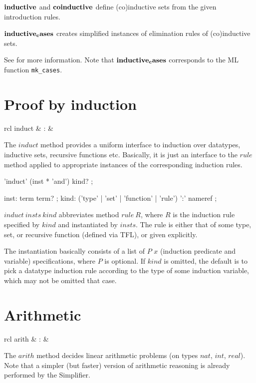 \begin{descr}
\item [${\mathord{\mathbf{inductive}}}$ and ${\mathord{\mathbf{coinductive}}}$] define
  (co)inductive sets from the given introduction rules.
\item [${\mathord{\mathbf{inductive_cases}}}$] creates simplified instances of
  elimination rules of (co)inductive sets.
\end{descr}

See \cite{isabelle-HOL} for more information.  Note that
${\mathord{\mathbf{inductive_cases}}}$ corresponds to the ML function
\texttt{mk_cases}.


\section{Proof by induction}

\begin{matharray}{rcl}
  induct & : & \isarmeth \\
\end{matharray}

The $induct$ method provides a uniform interface to induction over datatypes,
inductive sets, recursive functions etc.  Basically, it is just an interface
to the $rule$ method applied to appropriate instances of the corresponding
induction rules.

\begin{rail}
  'induct' (inst * 'and') kind?
  ;

  inst: term term?
  ;
  kind: ('type' | 'set' | 'function' | 'rule') ':' nameref
  ;
\end{rail}

\begin{descr}
\item [$induct~insts~kind$] abbreviates method $rule~R$, where $R$ is the
  induction rule specified by $kind$ and instantiated by $insts$.  The rule is
  either that of some type, set, or recursive function (defined via TFL), or
  given explicitly.
  
  The instantiation basically consists of a list of $P$ $x$ (induction
  predicate and variable) specifications, where $P$ is optional.  If $kind$ is
  omitted, the default is to pick a datatype induction rule according to the
  type of some induction variable, which may not be omitted that case.
\end{descr}


\section{Arithmetic}

\begin{matharray}{rcl}
  arith & : & \isarmeth \\
\end{matharray}

The $arith$ method decides linear arithmetic problems (on types $nat$, $int$,
$real$).  Note that a simpler (but faster) version of arithmetic reasoning is
already performed by the Simplifier.


